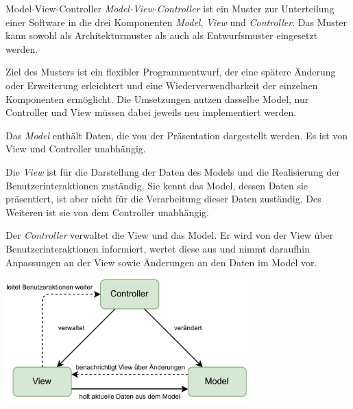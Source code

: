 \begin{defi}{Model-View-Controller}
    \emph{Model-View-Controller}  ist ein Muster zur Unterteilung einer Software in die drei Komponenten \emph{Model}, \emph{View} und \emph{Controller}.
    Das Muster kann sowohl als Architekturmuster als auch als Entwurfsmuster eingesetzt werden.

    Ziel des Musters ist ein flexibler Programmentwurf, der eine spätere Änderung oder Erweiterung erleichtert und eine Wiederverwendbarkeit der einzelnen Komponenten ermöglicht.
    Die Umsetzungen nutzen dasselbe Model, nur Controller und View müssen dabei jeweils neu implementiert werden.

    Das \emph{Model} enthält Daten, die von der Präsentation dargestellt werden.
    Es ist von View und Controller unabhängig.

    Die \emph{View} ist für die Darstellung der Daten des Models und die Realisierung der Benutzerinteraktionen zuständig.
    Sie kennt das Model, dessen Daten sie präsentiert, ist aber nicht für die Verarbeitung dieser Daten zuständig.
    Des Weiteren ist sie von dem Controller unabhängig.

    Der \emph{Controller} verwaltet die View und das Model.
    Er wird von der View über Benutzerinteraktionen informiert, wertet diese aus und nimmt daraufhin Anpassungen an der View sowie Änderungen an den Daten im Model vor.

    \begin{center}
        \includegraphics[width=0.7\textwidth]{includes/figures/defi_mvc.pdf}
    \end{center}
\end{defi}

